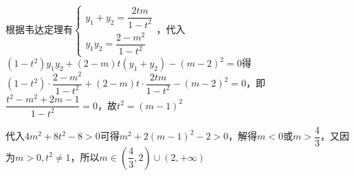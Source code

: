 \begin{enumerate}
\begin{jieda}
\begin{enumerate}
            根据韦达定理有$\left\{\begin{array}{l}
                 y_1+y_2 = \dfrac{2tm}{1-t^2} \\
                 y_1y_2 = \dfrac{2-m^2}{1-t^2}
            \end{array}\right.$，代入$(1-t^2)y_1y_2+(2-m)t(y_1+y_2) -(m-2)^2 = 0$得$(1-t^2)\cdot\dfrac{2-m^2}{1-t^2}+(2-m)t\cdot\dfrac{2tm}{1-t^2}-(m-2)^2 = 0$，即$\dfrac{t^2-m^2+2m-1}{1-t^2} = 0$，故$t^2 = (m-1)^2$

            代入$4m^2+8t^2-8 > 0$可得$m^2+2(m-1)^2-2>0$，解得$m < 0$或$m > \dfrac{4}{3}$，又因为$m > 0, t^2 \neq 1$，所以$m \in \left(\dfrac{4}{3}, 2\right) \cup (2, +\infty)$
        \end{enumerate}
    \end{jieda}
\end{enumerate}
